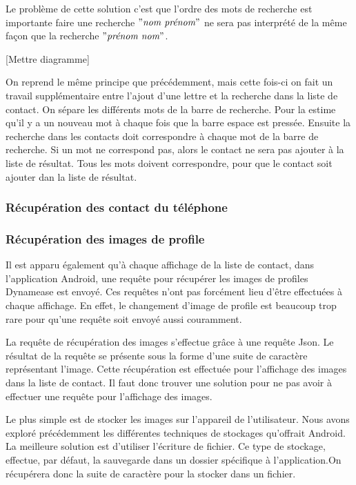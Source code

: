 Le problème de cette solution c'est que l'ordre des mots de recherche est importante faire une recherche $"\textit{nom prénom}"$ ne sera pas interprété de la même façon que la recherche $"\textit{prénom nom}"$.

[Mettre diagramme]

On reprend le même principe que précédemment, mais cette fois-ci on fait un travail supplémentaire entre l'ajout d'une lettre et la recherche dans la liste de contact. On sépare les différents mots de la barre de recherche. Pour la estime qu'il y a un nouveau mot à chaque fois que la barre espace est pressée. Ensuite la recherche dans les contacts doit correspondre à chaque mot de la barre de recherche. Si un mot ne correspond pas, alors le contact ne sera pas ajouter à la liste de résultat. Tous les mots doivent correspondre, pour que le contact soit ajouter dan la liste de résultat.

\subsubsection{Récupération des contact du téléphone}

\subsubsection{Récupération des images de profile}

Il est apparu également qu'à chaque affichage de la liste de contact, dans l'application Android, une requête pour récupérer les images de profiles Dynamease est envoyé. Ces requêtes n'ont pas forcément lieu d'être effectuées à chaque affichage. En effet, le changement d'image de profile est beaucoup trop rare pour qu'une requête soit envoyé aussi couramment.

La requête de récupération des images s'effectue grâce à une requête Json. Le résultat de la requête se présente sous la forme d'une suite de caractère représentant l'image. Cette récupération est effectuée pour l'affichage des images dans la liste de contact. Il faut donc trouver une solution pour ne pas avoir à effectuer une requête pour l'affichage des images.

Le plus simple est de stocker les images sur l'appareil de l'utilisateur. Nous avons exploré précédemment les différentes techniques de stockages qu'offrait Android. La meilleure solution est d'utiliser l'écriture de fichier. Ce type de stockage, effectue, par défaut, la sauvegarde dans un dossier spécifique à l'application.On récupérera donc la suite de caractère pour la stocker dans un fichier. 

